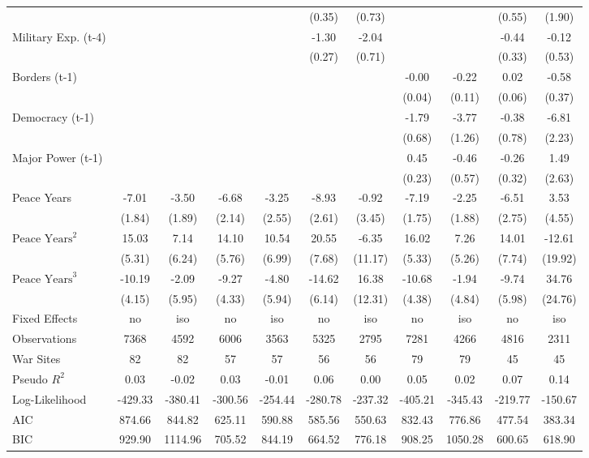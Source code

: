 \begin{tabular}{lcccccccccc}
&  &  &  &  & (0.35) & (0.73) &  &  & (0.55) & (1.90) \\
Military Exp. (t-4) &  &  &  &  & -1.30 & -2.04 &  &  & -0.44 & -0.12 \\
&  &  &  &  & (0.27) & (0.71) &  &  & (0.33) & (0.53) \\
Borders (t-1) &  &  &  &  &  &  & -0.00 & -0.22 & 0.02 & -0.58 \\
&  &  &  &  &  &  & (0.04) & (0.11) & (0.06) & (0.37) \\
Democracy (t-1) &  &  &  &  &  &  & -1.79 & -3.77 & -0.38 & -6.81 \\
&  &  &  &  &  &  & (0.68) & (1.26) & (0.78) & (2.23) \\
Major Power (t-1) &  &  &  &  &  &  & 0.45 & -0.46 & -0.26 & 1.49 \\
&  &  &  &  &  &  & (0.23) & (0.57) & (0.32) & (2.63) \\
Peace Years & -7.01 & -3.50 & -6.68 & -3.25 & -8.93 & -0.92 & -7.19 & -2.25 & -6.51 & 3.53 \\
& (1.84) & (1.89) & (2.14) & (2.55) & (2.61) & (3.45) & (1.75) & (1.88) & (2.75) & (4.55) \\
$\text{Peace Years}^2$ & 15.03 & 7.14 & 14.10 & 10.54 & 20.55 & -6.35 & 16.02 & 7.26 & 14.01 & -12.61 \\
& (5.31) & (6.24) & (5.76) & (6.99) & (7.68) & (11.17) & (5.33) & (5.26) & (7.74) & (19.92) \\
$\text{Peace Years}^3$ & -10.19 & -2.09 & -9.27 & -4.80 & -14.62 & 16.38 & -10.68 & -1.94 & -9.74 & 34.76 \\
& (4.15) & (5.95) & (4.33) & (5.94) & (6.14) & (12.31) & (4.38) & (4.84) & (5.98) & (24.76) \\
\midrule
Fixed Effects & no & iso & no & iso & no & iso & no & iso & no & iso \\
Observations & 7368 & 4592 & 6006 & 3563 & 5325 & 2795 & 7281 & 4266 & 4816 & 2311 \\
War Sites & 82 & 82 & 57 & 57 & 56 & 56 & 79 & 79 & 45 & 45 \\
Pseudo $R^2$ & 0.03 & -0.02 & 0.03 & -0.01 & 0.06 & 0.00 & 0.05 & 0.02 & 0.07 & 0.14 \\
Log-Likelihood & -429.33 & -380.41 & -300.56 & -254.44 & -280.78 & -237.32 & -405.21 & -345.43 & -219.77 & -150.67 \\
AIC & 874.66 & 844.82 & 625.11 & 590.88 & 585.56 & 550.63 & 832.43 & 776.86 & 477.54 & 383.34 \\
BIC & 929.90 & 1114.96 & 705.52 & 844.19 & 664.52 & 776.18 & 908.25 & 1050.28 & 600.65 & 618.90 \\
\bottomrule
\end{tabular}
